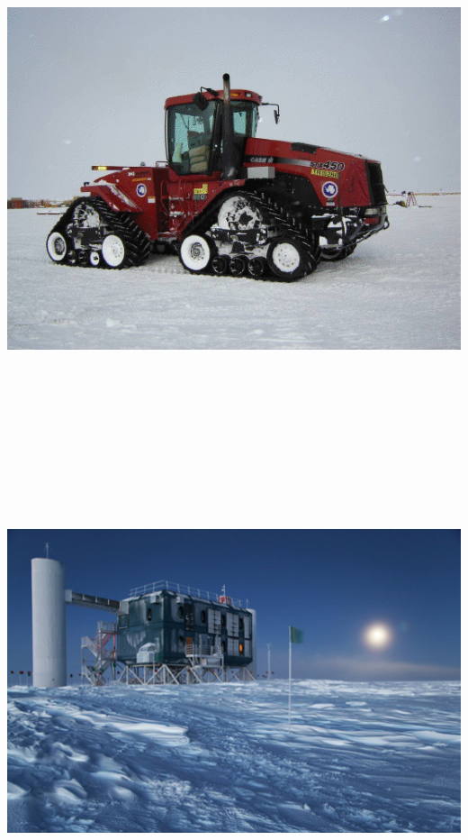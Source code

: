 \Tr
\begin{center}
\includegraphics[keepaspectratio,height=14.5cm]{tractor}
\end{center}

\Tr
\begin{center}
\includegraphics[keepaspectratio,height=14cm]{icl2}
\end{center}

